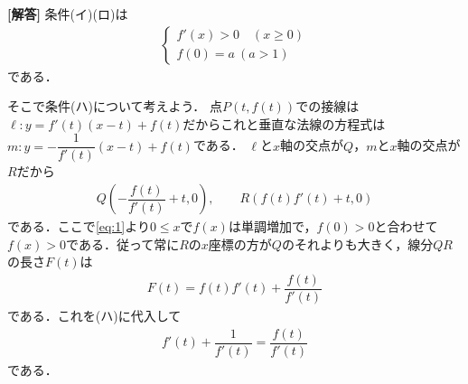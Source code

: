 \documentclass[../../main.tex]{subfiles}
\begin{document}
\begin{oframed}
  
\end{oframed}

{\bf [解答]}
条件(イ)(ロ)は
\begin{align}
  \begin{cases}
    f'(x)>0 \quad (x \ge 0) \\
    f(0)=a\ (a>1)
  \end{cases} \label{eq:1}
\end{align}
である．

そこで条件(ハ)について考えよう．
点$P(t,f(t))$での接線は$\ell: y=f'(t)(x-t)+f(t)$だからこれと垂直な法線の方程式は$m: y=-\dfrac{1}{f'(t)}(x-t)+f(t)$である．
$\ell$と$x$軸の交点が$Q$，$m$と$x$軸の交点が$R$だから
\begin{align}
  Q\left(-\dfrac{f(t)}{f'(t)}+t,0\right), \qquad R(f(t)f'(t)+t,0) \label{eq:2}
\end{align}
である．ここで\cref{eq:1}より$0 \le x$で$f(x)$は単調増加で，$f(0)>0$と合わせて$f(x)>0$である．従って常に$R$の$x$座標の方が$Q$のそれよりも大きく，線分$QR$の長さ$F(t)$は
\begin{align}
  F(t)=f(t)f'(t)+\dfrac{f(t)}{f'(t)} \label{eq:3}
\end{align}
である．これを(ハ)に代入して
\begin{align}
  f'(t)+\dfrac{1}{f'(t)}=\dfrac{f(t)}{f'(t)} \label{eq:4}
\end{align}
である．
\end{document}
